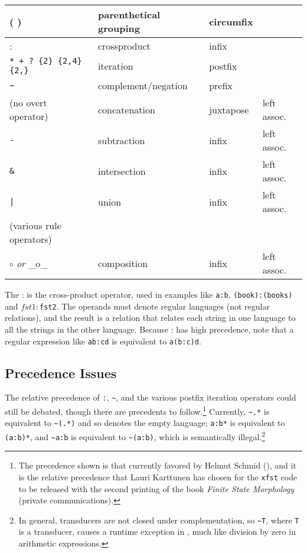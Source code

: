 \noindent
\begin{tabular}{|l|l|l|l|}
\hline
( ) &  parenthetical grouping & circumfix &\\
\hline
: & crossproduct & infix &\\
\hline
\verb!* + ? {2} {2,4} {2,}! & iteration & postfix &\\
\hline
\verb!~!  & complement/negation & prefix & \\
\hline
(no overt operator) & concatenation & juxtapose & left assoc.\\
\hline
\verb!-! & subtraction  & infix & left assoc.\\
\hline
\verb!&! & intersection & infix & left assoc.\\
\hline
\verb!|! & union        & infix & left assoc.\\
\hline
(various rule operators) & & &\\
\hline
$\circ$ \emph{or} \_o\_  & composition & infix & left assoc.\\
\hline
\end{tabular}

\vspace{0.5cm}
The : is the cross-product operator, used in examples like \texttt{a:b},
\texttt{(book):(books)} and \texttt{$fst1:$fst2}.  The operands must
denote regular languages (not regular relations), and the result is a
relation that relates each string in one language to all the strings in
the other language.  Because : has high precedence, note that a regular
expression like \texttt{ab:cd} is equivalent to \texttt{a(b:c)d}.



\subsection{Precedence Issues}
 
The relative precedence of  \verb!:!, \verb!~!, and the various postfix
iteration operators could still be debated, though
there are precedents to follow.\footnote{The precedence shown is
that currently favored by Helmut Schmid (), and it is the relative precedence that Lauri Karttunen
has chosen for the  \texttt{xfst} code to be released with the second printing of
the book \emph{Finite State Morphology} (private communications).}
Currently, \verb!~.*! is
equivalent to \verb!~(.*)! and so denotes the empty language; \verb!a:b*!
is equivalent to \verb!(a:b)*!, and \verb!~a:b! is equivalent to
\verb!~(a:b)!, which is semantically illegal.\footnote{In general, transducers are not closed under
complementation, so \texttt{\~{}T}, where \texttt{T} is a transducer, causes a
runtime exception in \Kleene{}, much like division by zero in
arithmetic expressions.}

